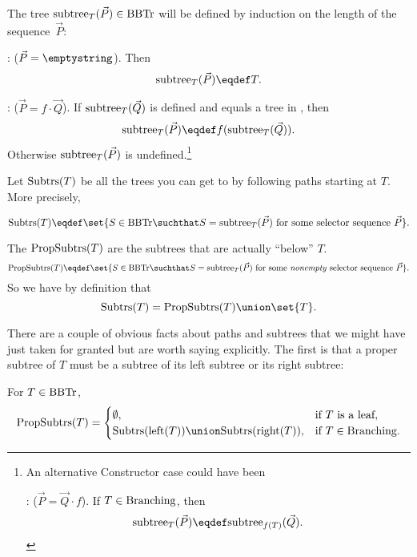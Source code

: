 \begin{definition}
The tree $\text{subtree}_{T}(\vec{P}) \in \text{BBTr}$ will be defined by induction
on the length of the sequence~$\vec{P}$:

: ($\vec{P} = \emptystring$).
Then
\[
\rslt{T}{(\vec{P})} \eqdef T.
\]

: ($\vec{P} = f \cdot \vec{Q}$).  If
$\text{subtree}_{T}(\vec{Q})$ is defined and equals a tree in \brnchng, then
\[
\rslt{T}{(\vec{P})} \eqdef f(\rslt{T}{(\vec{Q})}).
\]
Otherwise $\text{subtree}_{T}(\vec{P})$ is undefined.\footnote{An alternative
  Constructor case could have been

: ($\vec{P} = \vec{Q} \cdot f$).  If
$T \in \text{Branching}$, then
\[
\rslt{T}{(\vec{P})} \eqdef \rslt{f(T)}{(\vec{Q})}.
\]}

\end{definition}
\medskip

Let $\text{Subtrs}(T)$ be all the trees you can get to by following paths
starting at $T$.  More precisely,
\begin{definition}\label{def:subtree}
\[
\subbrn{T} \eqdef \set{S \in \brnch \suchthat S =
  \rslt{T}{(\vec{P})}\ \text{for some selector sequence}\ \vec{P}}.
\]
\end{definition}

The  $\text{PropSubtrs}(T)$ are the subtrees that are
actually ``below'' $T$.
\[
\propbrn{T} \eqdef \set{S \in \brnch \suchthat S =
  \rslt{T}{(\vec{P})}\ \text{for some \emph{nonempty} selector
    sequence}\ \vec{P}}.
\]
So we have by definition that
\begin{equation}\label{subtree-proptree}
\subbrn{T} = \propbrn{T} \union \set{T}.
\end{equation}

There are a couple of obvious facts about paths and subtrees that we
might have just taken for granted but are worth saying explicitly.
The first is that a proper subtree of $T$ must be a subtree of its
left subtree or its right subtree:

\begin{corollary}\label{unionLR}
For $T \in \text{BBTr}$,
\[
\propbrn{T} =
\begin{cases}
  \emptyset, & \text{if $T$ is a leaf},\\
  \subbrn{\leftsub{(T)}} \union \subbrn{\rightsub{(T)}},
            & \text{if}\ T \in \brnchng.
\end{cases}
\]
\end{corollary}

